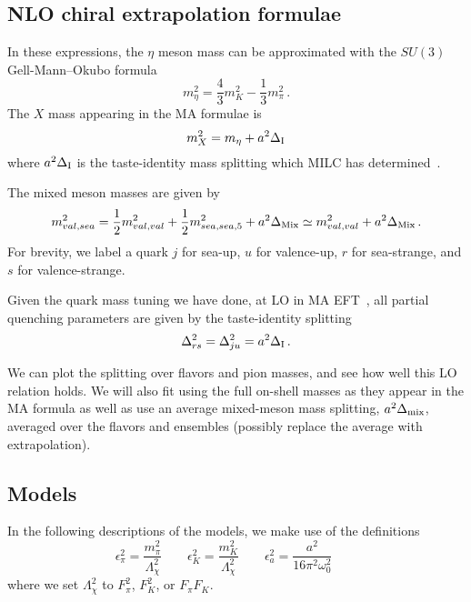 \documentclass[prd,tightenlines,preprintnumbers,showpacs,superscriptaddress,notitlepage,eqsecnum,floatfix,notitlepage]{revtex4-1}
\begin{document}
\subsection{NLO chiral extrapolation formulae}

In these expressions, the $\eta$ meson mass can be approximated with the $SU(3)$ Gell-Mann--Okubo formula
\begin{equation}
m_\eta^2 = \frac{4}{3} m_K^2 - \frac{1}{3}m_\pi^2\, .
\end{equation}
The $X$ mass appearing in the MA formulae is
\begin{equation}
m_X^2 = m_\eta + a^2 \Delta_{\rm I}
\end{equation}
where $a^2 \Delta_{\rm I}$ is the taste-identity mass splitting which MILC has determined~\cite{Bazavov:2012xda}.

The mixed meson masses are given by
\begin{equation}
m_{val,sea}^2 = \frac{1}{2}m_{val,val}^2 + \frac{1}{2}m_{sea,sea,5}^2 + a^2 \Delta_{\rm Mix}
\simeq m_{val,val}^2 + a^2 \Delta_{\rm Mix}\, .
\end{equation}
For brevity, we label a quark $j$ for sea-up, $u$ for valence-up, $r$ for sea-strange, and $s$ for valence-strange.

Given the quark mass tuning we have done, at LO in MA EFT~\cite{Chen:2006wf}, all partial quenching parameters are given by the taste-identity splitting
\begin{equation}
\Delta_{rs}^2 = \Delta_{ju}^2 = a^2 \Delta_{\rm I}\, .
\end{equation}

We can plot the splitting over flavors and pion masses, and see how well this LO relation holds.  We will also fit using the full on-shell masses as they appear in the MA formula as well as use an average mixed-meson mass splitting, $a^2 \Delta_{\rm mix}$, averaged over the flavors and ensembles (possibly replace the average with extrapolation).





\subsection{Models} \label{section:base_models}
In the following descriptions of the models, we make use of the definitions
\begin{equation}
\epsilon_\pi^2 = \frac{m_\pi^2}{\Lambda_\chi^2} \qquad
\epsilon_K^2 = \frac{m_K^2}{\Lambda_\chi^2} \qquad
\epsilon_a^2 = \frac{a^2}{16 \pi ^2\omega_0^2} \qquad
\end{equation}
where we set $\Lambda_\chi^2$ to $F_\pi^2$, $F_K^2$, or $F_\pi F_K$.
\end{document}

